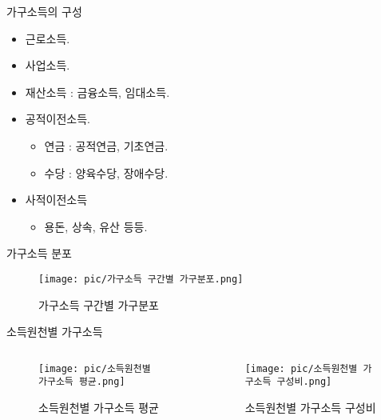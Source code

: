 \documentclass[aspectratio=169,xcolor=dvipsnames,handout]{beamer}
\begin{document}
\begin{frame}{가구소득의 구성}
    \begin{itemize}
        \item 근로소득.
        \item 사업소득.
        \item 재산소득 : 금융소득, 임대소득.
        \item 공적이전소득.
        \begin{itemize}
            \item 연금 : 공적연금, 기초연금.
            \item 수당 : 양육수당, 장애수당.
        \end{itemize}
        \item 사적이전소득
        \begin{itemize}
            \item 용돈, 상속, 유산 등등. 
        \end{itemize}
    \end{itemize}
\end{frame}

\begin{frame}{가구소득 분포}
\centering
\begin{figure}
    \texttt{[image: pic/가구소득 구간별 가구분포.png]}
    \caption{가구소득 구간별 가구분포}
\end{figure}

\end{frame}
\begin{frame}{소득원천별 가구소득}
\begin{columns}
    \begin{column}{.5\textwidth}
        \begin{figure}
            \centering
            \texttt{[image: pic/소득원천별 가구소득 평균.png]}
            \caption{소득원천별 가구소득 평균}
        \end{figure}
    \end{column}    
    \begin{column}{.5\textwidth}
        \begin{figure}
            \centering
            \texttt{[image: pic/소득원천별 가구소득 구성비.png]}
            \caption{소득원천별 가구소득 구성비}
        \end{figure}
    \end{column}    
\end{columns}
\end{frame}
\end{document}
